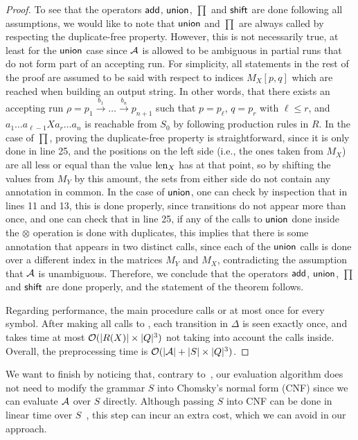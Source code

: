 \begin{proof}
	To see that the operators $\mathsf{add}$, $\mathsf{union}$, $\prod$ and $\mathsf{shift}$ are done following all assumptions, we would like to note that $\mathsf{union}$ and $\prod$ are always called by respecting the duplicate-free property. However, this is not necessarily true, at least for the $\mathsf{union}$ case since $\mathcal{A}$ is allowed to be ambiguous in partial runs that do not form part of an accepting run. For simplicity, all statements in the rest of the proof are assumed to be said with respect to indices $M_X[p,q]$ which are reached when building an output string. In other words, that there exists an accepting run $\rho = p_1 \xrightarrow{b_1} \ldots \xrightarrow{b_n} p_{n+1}$ such that $p = p_\ell$, $q = p_r$ with $\ell \leq r$, and  $a_1\ldots a_{\ell-1}Xa_r\ldots a_n$ is reachable from $S_0$ by following production rules in $R$.
	In the case of $\prod$, proving the duplicate-free property is straightforward, since it is only done in line 25, and the positions on the left side (i.e., the ones taken from $M_X$) are all less or equal than the value $\operatorname{len}_X$ has at that point, so by shifting the values from $M_Y$ by this amount, the sets from either side do not contain any annotation in common. In the case of $\mathsf{union}$, one can check by inspection that in lines 11 and 13, this is done properly, since transitions do not appear more than once, and one can check that in line 25, if any of the calls to $\mathsf{union}$ done inside the $\otimes$ operation is done with duplicates, this implies that there is some annotation that appears in two distinct calls, since each of the $\mathsf{union}$ calls is done over a different index in the matrices $M_Y$ and $M_X$,  contradicting the assumption that $\mathcal{A}$ is unambiguous. Therefore, we conclude that the operators $\mathsf{add}$, $\mathsf{union}$, $\prod$ and $\mathsf{shift}$ are done properly, and the statement of the theorem follows.
	
	Regarding performance, the main procedure calls  or  at most once for every symbol. After making all calls to , each transition in $\Delta$ is seen exactly once, and  takes time at most $\mathcal{O}(|R(X)|\times|Q|^3)$ not taking into account the calls inside. Overall, the preprocessing time is $\mathcal{O}(|\mathcal{A}| + |S|\times|Q|^3)$.
\end{proof}

We want to finish by noticing that, contrary to~\cite{SchmidS21}, our evaluation algorithm does not need to modify the grammar $S$ into Chomsky's normal form (CNF) since we can evaluate $\mathcal{A}$ over $S$ directly. Although passing $S$ into CNF can be done in linear time over $S$~\cite{SchmidS21}, this step can incur an extra cost, which we can avoid in our approach. 





